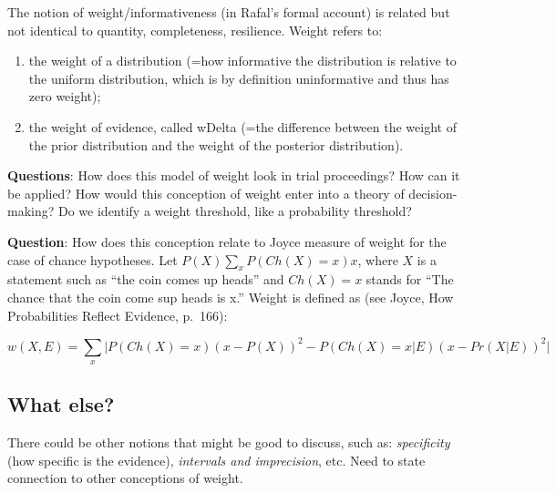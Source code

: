 \documentclass[
  10pt,
  dvipsnames,enabledeprecatedfontcommands]{scrartcl}
\begin{document}
The notion of weight/informativeness (in Rafal's formal account) is
related but not identical to quantity, completeness, resilience. Weight
refers to:

\begin{enumerate}
\def\labelenumi{(\alph{enumi})}
\item
  the weight of a distribution (=how informative the distribution is
  relative to the uniform distribution, which is by definition
  uninformative and thus has zero weight);
\item
  the weight of evidence, called wDelta (=the difference between the
  weight of the prior distribution and the weight of the posterior
  distribution).
\end{enumerate}

\textbf{Questions}: How does this model of weight look in trial
proceedings? How can it be applied? How would this conception of weight
enter into a theory of decision-making? Do we identify a weight
threshold, like a probability threshold?


\textbf{Question}: How does this conception relate to Joyce measure of
weight for the case of chance hypotheses. Let
\(P(X)\sum_x P(Ch(X)=x)x\), where \(X\) is a statement such as ``the
coin comes up heads'' and \(Ch(X)=x\) stands for ``The chance that the
coin come sup heads is x.'' Weight is defined as (see Joyce, How
Probabilities Reflect Evidence, p.~166):


\[w(X, E) = \sum_x \vert P(Ch(X)=x)(x-P(X))^2 - P(Ch(X)=x \vert E)(x-Pr(X \vert E))^2\vert\]

\hypertarget{what-else}{%
\subsection{What else?}\label{what-else}}

There could be other notions that might be good to discuss, such as:
\emph{specificity} (how specific is the evidence), \emph{intervals and
imprecision}, etc. Need to state connection to other conceptions of
weight.

\end{document}

